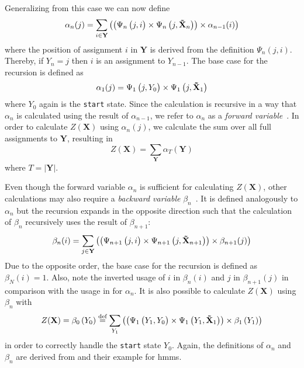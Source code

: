 Generalizing from this case we can now define
\begin{equation}
  \label{equ:linear-chain-crf-z-alpha}
  \alpha_n(j) = \sum_{i\in\mathbf{Y}}\left(\left(\Psi_n\left(\vphantom{\tilde{X}}j,i\right)\times\Psi_n\left(j,\mathbf{\tilde{X}}_n\right)\right)\times \alpha_{n-1}(i)\right)
\end{equation}
where the position of assignment $i$ in $\mathbf{Y}$ is derived from the definition $\Psi_n(j,i)$.
Thereby, if $Y_n=j$ then $i$ is an assignment to $Y_{n-1}$.
The base case for the recursion is defined as
\begin{equation}
  \label{equ:linear-chain-crf-z-alpha-base}
 \alpha_1(j) = \Psi_1\left(\vphantom{\tilde{X}}j,Y_0\right)\times\Psi_1\left(j,\mathbf{\tilde{X}}_1\right)
\end{equation}
where $Y_0$ again is the \texttt{start} state. Since the calculation is recursive in a way that $\alpha_n$ is calculated using the result of $\alpha_{n-1}$, we refer to $\alpha_n$ as a \textit{forward variable}~\citep{sutton2010introduction}. In order to calculate $Z(\mathbf{X})$ using $\alpha_n(j)$, we calculate the sum over all \glspl{full assignment} to $\mathbf{Y}$, resulting in
\begin{equation}
  \label{equ:linear-chain-crf-z-alpha-sum}
  Z(\mathbf{X})=\sum_{\mathbf{Y}}\alpha_T\left(\mathbf{Y}\right)
\end{equation}
where $T=|\mathbf{Y}|$.
\bigskip

Even though the forward variable $\alpha_n$ is sufficient for calculating $Z(\mathbf{X})$, other calculations may also require a \textit{backward variable} $\beta_n$~\citep{sutton2010introduction}. It is defined analogously to $\alpha_n$ but the recursion expands in the opposite direction such that the calculation of $\beta_n$ recursively uses the result of $\beta_{n+1}$:
\begin{equation}
  \label{equ:linear-chain-crf-z-beta}
  \beta_n(i) = \sum_{j\in\mathbf{Y}}\left(\left(\Psi_{n+1}\left(\vphantom{\tilde{X}}j,i\right)\times\Psi_{n+1}\left(j,\mathbf{\tilde{X}}_{n+1}\right)\right)\times \beta_{n+1}(j)\right)
\end{equation}
Due to the opposite order, the base case for the recursion is defined as $\beta_N(i)=1$.
Also, note the inverted usage of $i$ in $\beta_n(i)$ and $j$ in $\beta_{n+1}(j)$ in comparison with the usage in  for $\alpha_n$.
It is also possible to calculate $Z(\mathbf{X})$ using $\beta_n$ with
\begin{equation}
  \label{equ:linear-chain-crf-z-beta-sum}
  Z(\mathbf{X})=\beta_0\left(Y_0\right)\equalsdef\sum_{Y_1}\left(\left(\Psi_1\left(\vphantom{\tilde{X}}Y_1,Y_0\right)\times\Psi_1\left(Y_1,\mathbf{\tilde{X}}_1\right)\right)\times\beta_1\left(Y_1\right)\right)
\end{equation}
in order to correctly handle the \texttt{start} state $Y_0$.
Again, the definitions of $\alpha_n$ and $\beta_n$ are derived from \citet{sutton2010introduction} and their example for \glspl{hmm}.

